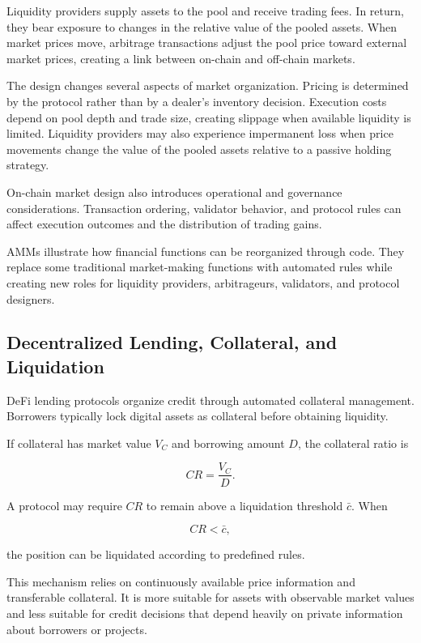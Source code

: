 Liquidity providers supply assets to the pool and receive trading fees. In return, they bear exposure to changes in the relative value of the pooled assets. When market prices move, arbitrage transactions adjust the pool price toward external market prices, creating a link between on-chain and off-chain markets.

The design changes several aspects of market organization. Pricing is determined by the protocol rather than by a dealer's inventory decision. Execution costs depend on pool depth and trade size, creating slippage when available liquidity is limited. Liquidity providers may also experience impermanent loss when price movements change the value of the pooled assets relative to a passive holding strategy.

On-chain market design also introduces operational and governance considerations. Transaction ordering, validator behavior, and protocol rules can affect execution outcomes and the distribution of trading gains.

AMMs illustrate how financial functions can be reorganized through code. They replace some traditional market-making functions with automated rules while creating new roles for liquidity providers, arbitrageurs, validators, and protocol designers.


\subsection{Decentralized Lending, Collateral, and Liquidation}

DeFi lending protocols organize credit through automated collateral management. Borrowers typically lock digital assets as collateral before obtaining liquidity.

If collateral has market value \(V_C\) and borrowing amount \(D\), the collateral ratio is

\begin{equation}
CR=\frac{V_C}{D}.
\label{eq:ch24-defi-collateral-ratio}
\end{equation}

A protocol may require \(CR\) to remain above a liquidation threshold \(\bar{c}\). When

\begin{equation}
CR<\bar{c},
\label{eq:ch24-defi-liquidation-condition}
\end{equation}

the position can be liquidated according to predefined rules.

This mechanism relies on continuously available price information and transferable collateral. It is more suitable for assets with observable market values and less suitable for credit decisions that depend heavily on private information about borrowers or projects.

